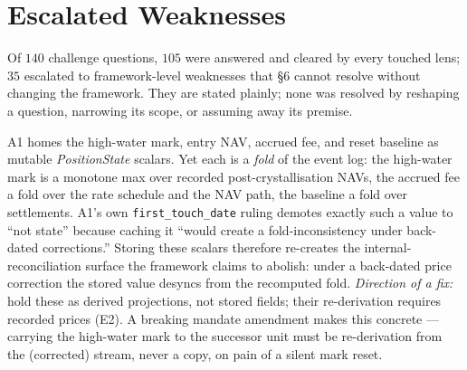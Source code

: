\documentclass[11pt,a4paper]{article}
\begin{document}
\section{Escalated Weaknesses}
\label{sec:escalations}

Of $140$ challenge questions, $105$ were answered and cleared by every touched lens; $35$ escalated
to framework-level weaknesses that \S 6 cannot resolve without changing the framework. They are
stated plainly; none was resolved by reshaping a question, narrowing its scope, or assuming away
its premise.

\begin{description}[leftmargin=0pt,style=nextline]
\item[\textbf{E1 --- Store-vs-derive economic scalars (an Addendum~A1 internal inconsistency).}]
A1 homes the high-water mark, entry NAV, accrued fee, and reset baseline as mutable
\textit{PositionState} scalars. Yet each is a \emph{fold} of the event log: the high-water mark is
a monotone max over recorded post-crystallisation NAVs, the accrued fee a fold over the rate
schedule and the NAV path, the baseline a fold over settlements. A1's own \texttt{first\_touch\_date}
ruling demotes exactly such a value to ``not state'' because caching it ``would create a
fold-inconsistency under back-dated corrections.'' Storing these scalars therefore re-creates the
internal-reconciliation surface the framework claims to abolish: under a back-dated price
correction the stored value desyncs from the recomputed fold. \emph{Direction of a fix:} hold these
as derived projections, not stored fields; their re-derivation requires recorded prices (E2). A
breaking mandate amendment makes this concrete --- carrying the high-water mark to the successor
unit must be re-derivation from the (corrected) stream, never a copy, on pain of a silent mark
reset.


\end{description}
\end{document}
